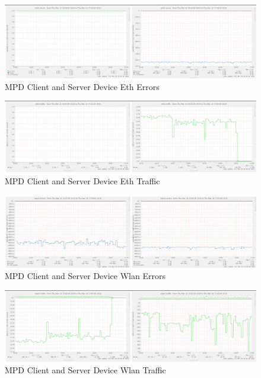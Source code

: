 \documentclass[11pt,a4paper,headinclude=false,footinclude=false]{scrreprt}
\begin{document}
\begin{figure}[H]
\includegraphics{ResultsAndAnalysis/MPDServerTestImages/009MPDEth0Errors.png}
\centering
\caption{MPD Client and Server Device Eth Errors}
\label{MPDEthError}
\end{figure}

\begin{figure}[H]
\includegraphics{ResultsAndAnalysis/MPDServerTestImages/010MPDEth0Traffic.png}
\centering
\caption{MPD Client and Server Device Eth Traffic}
\label{MPDEthTraffic}
\end{figure}

\begin{figure}[H]
\includegraphics{ResultsAndAnalysis/MPDServerTestImages/020MPDWlan0Errors.png}
\centering
\caption{MPD Client and Server Device Wlan Errors}
\label{MPDWlanError}
\end{figure}

\begin{figure}[H]
\includegraphics{ResultsAndAnalysis/MPDServerTestImages/021MPDWlan0Traffic.png}
\centering
\caption{MPD Client and Server Device Wlan Traffic}
\label{MPDWlanTraffic}
\end{figure}
\end{document}
